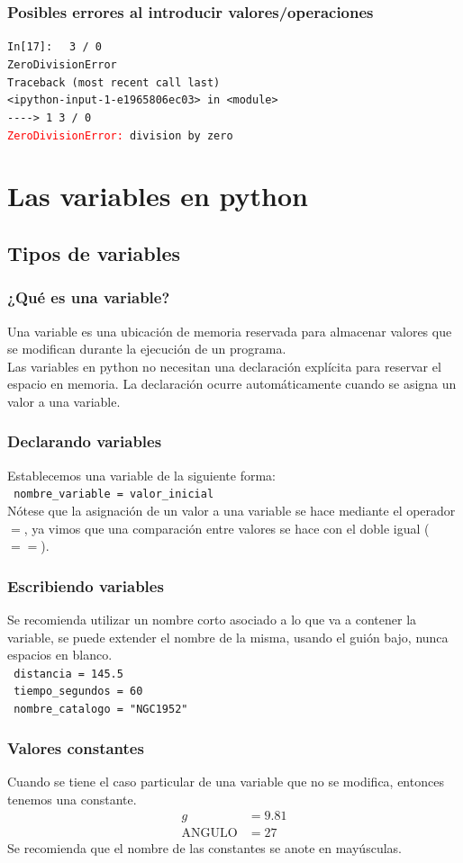 \documentclass[12pt]{beamer}
\begin{document}
\begin{frame}[fragile]
\frametitle{Posibles errores al introducir valores/operaciones}
\textcolor{ao}{\texttt{In[17]: }} \verb| 3 / 0 | \\
\pause
{\fontsize{12}{12}\selectfont
\verb|ZeroDivisionError | \\
\verb|Traceback (most recent call last)| \\
\verb|<ipython-input-1-e1965806ec03> in <module>| \\
\verb|----> 1 3 / 0| \\
\textcolor{red}{\texttt{ZeroDivisionError:}}\verb| division by zero|}
\end{frame}
    

\section{Las variables en python}
\subsection{Tipos de variables}

\begin{frame}
\frametitle{¿Qué es una variable?}
Una variable es una ubicación de memoria reservada para almacenar valores que se modifican durante la ejecución de un programa.
\\
\bigskip
\pause
Las variables en python no necesitan una declaración explícita para reservar el espacio en memoria. La declaración ocurre automáticamente cuando se asigna un valor a una variable.
\end{frame}
\begin{frame}[fragile]
\frametitle{Declarando variables}
Establecemos una variable de la siguiente forma:
\\[1em]
\pause
\verb| nombre_variable = valor_inicial |
\\
\bigskip
Nótese que la asignación de un valor a una variable se hace mediante el operador $=$, ya vimos que una comparación entre valores se hace con el doble igual ($==$).
\end{frame}
\begin{frame}[fragile]
\frametitle{Escribiendo variables}
Se recomienda utilizar un nombre corto asociado a lo que va a contener la variable, se puede extender el nombre de la misma, usando el guión bajo, nunca espacios en blanco.
\\
\bigskip
\pause
\verb| distancia = 145.5 | \\
\verb| tiempo_segundos = 60 | \\
\verb| nombre_catalogo = "NGC1952" |
\end{frame}
\begin{frame}[fragile]
\frametitle{Valores constantes}
Cuando se tiene el caso particular de una variable que no se modifica, entonces tenemos una constante.
\pause
\begin{eqnarray*}
g &= 9.81 \\
\mbox{ANGULO} &= 27
\end{eqnarray*}
\pause 
Se recomienda que el nombre de las constantes se anote en mayúsculas.
\end{frame}
\end{document}
